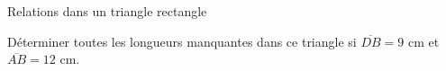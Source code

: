 \documentclass{beamer}
\begin{document}
\begin{frame}{Relations dans un triangle rectangle}
 \begin{minipage}[t]{0.4\textwidth}{
		\vspace{0pt}
		Déterminer toutes les longueurs manquantes dans ce triangle si $\overline{DB}=9\text{ cm}$ et $\overline{AB}=12 \text{ cm}$.	
		}
		\end{minipage}
		\hfill
\begin{minipage}[t]{0.5\textwidth}{
		\vspace{0pt}
}
\end{minipage}
\end{frame}
\end{document}
